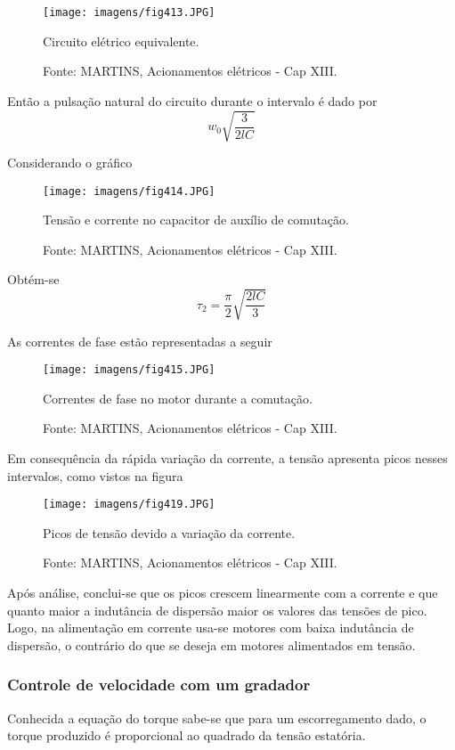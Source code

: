 \begin{figure}[ht!]
\center
\texttt{[image: imagens/fig413.JPG]}
\caption{\label{fig:fig413} Circuito elétrico equivalente.}
\caption*{Fonte: MARTINS, Acionamentos elétricos - Cap XIII.}
\end{figure}

Então a pulsação natural do circuito durante o intervalo é dado por
\[ w_0 \sqrt{\frac{3}{2lC}}  \]

Considerando o gráfico

\begin{figure}[ht!]
\center
\texttt{[image: imagens/fig414.JPG]}
\caption{\label{fig:fig414} Tensão e corrente no capacitor de auxílio de comutação.}
\caption*{Fonte: MARTINS, Acionamentos elétricos - Cap XIII.}
\end{figure}

Obtém-se
\[ \tau _2 = \frac{\pi }{2}\sqrt{\frac{2lC}{3}}  \]

As correntes de fase estão representadas a seguir

\begin{figure}[ht!]
\center
\texttt{[image: imagens/fig415.JPG]}
\caption{\label{fig:fig415} Correntes de fase no motor durante a comutação.}
\caption*{Fonte: MARTINS, Acionamentos elétricos - Cap XIII.}
\end{figure}

Em consequência da rápida variação da corrente, a tensão apresenta picos nesses intervalos, como vistos na figura

\begin{figure}[ht!]
\center
\texttt{[image: imagens/fig419.JPG]}
\caption{\label{fig:fig419} Picos de tensão devido a variação da corrente.}
\caption*{Fonte: MARTINS, Acionamentos elétricos - Cap XIII.}
\end{figure}

Após análise, conclui-se que os picos crescem linearmente com a corrente e que quanto maior a indutância de dispersão maior os valores das tensões de pico.
Logo, na alimentação em corrente usa-se motores com baixa indutância de dispersão, o contrário do que se deseja em motores alimentados em tensão.

\subsubsection{Controle de velocidade com um gradador}

Conhecida a equação do torque sabe-se que para um escorregamento dado, o torque produzido é proporcional ao quadrado da tensão estatória.

